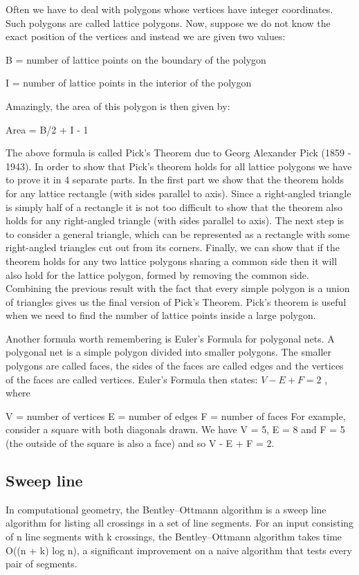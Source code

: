\documentclass[10pt,letterpaper,twocolumn,twosided]{article}
\begin{document}
Often we have to deal with polygons whose vertices have integer coordinates. Such polygons are called lattice polygons. Now, suppose we do not know the exact position of the vertices and instead we are given two values:

B = number of lattice points on the boundary of the polygon

I = number of lattice points in the interior of the polygon

Amazingly, the area of this polygon is then given by:

Area = B/2 + I - 1

The above formula is called Pick's Theorem due to Georg Alexander Pick (1859 - 1943). In order to show that Pick's theorem holds for all lattice polygons we have to prove it in 4 separate parts. In the first part we show that the theorem holds for any lattice rectangle (with sides parallel to axis). Since a right-angled triangle is simply half of a rectangle it is not too difficult to show that the theorem also holds for any right-angled triangle (with sides parallel to axis). The next step is to consider a general triangle, which can be represented as a rectangle with some right-angled triangles cut out from its corners. Finally, we can show that if the theorem holds for any two lattice polygons sharing a common side then it will also hold for the lattice polygon, formed by removing the common side. Combining the previous result with the fact that every simple polygon is a union of triangles gives us the final version of Pick's Theorem. Pick's theorem is useful when we need to find the number of lattice points inside a large polygon. 

Another formula worth remembering is Euler's Formula for polygonal nets. A polygonal net is a simple polygon divided into smaller polygons. The smaller polygons are called faces, the sides of the faces are called edges and the vertices of the faces are called vertices. Euler's Formula then states:
$V - E + F = 2$ , where

V = number of vertices
E = number of edges
F = number of faces
For example, consider a square with both diagonals drawn. We have V = 5, E = 8 and F = 5 (the outside of the square is also a face) and so V - E + F = 2. 

\subsection{Sweep line}

In computational geometry, the Bentley–Ottmann algorithm is a sweep line algorithm for listing all crossings in a set of line segments. For an input consisting of n line segments with k crossings, the Bentley–Ottmann algorithm takes time O((n + k) log n), a significant improvement on a naive algorithm that tests every pair of segments.
\end{document}
